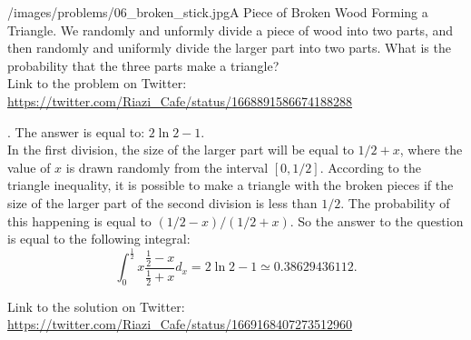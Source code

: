 \begin{problem}{/images/problems/06_broken_stick.jpg}{A Piece of Broken Wood Forming a Triangle}.
We randomly and unformly divide a piece of wood into two parts, and then randomly and uniformly  divide the larger part into two parts. What is the probability that the three parts make a triangle?\\[0.2cm]

Link to the problem on Twitter:  \url{https://twitter.com/Riazi_Cafe/status/1668891586674188288}\end{problem}
\begin{solution}.
The answer is equal to: $2 \ln 2 - 1$.\\[0.2cm]

In the first division, the size of the larger part will be equal to $1/2 + x$, where the value of $x$ is drawn randomly from the interval $[0,1/2]$. According to the triangle inequality, it is possible to make a triangle with the broken pieces if the size of the larger part of the second division is less than $1/2$. The probability of this happening is equal to $(1/2 - x)/(1/2+x)$. So the answer to the question is equal to the following integral:
$$\int_{0}^{\frac{1}{2}} x \frac{\frac{1}{2} - x}{\frac{1}{2} + x} d_x  = 2\ln 2-1 \simeq 0.38629436112.$$



Link to the solution on Twitter:  \url{https://twitter.com/Riazi_Cafe/status/1669168407273512960}\end{solution}
